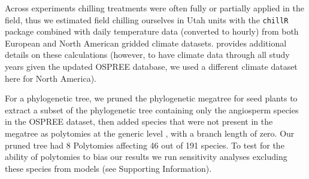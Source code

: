 \documentclass[11pt]{article}
\begin{document}
Across experiments chilling treatments were often fully or partially applied in the field, thus we estimated field chilling ourselves in Utah units with the \verb|chillR| package combined with daily temperature data (converted to hourly) from both European \citep[E-OBS, version 16, calculating the average of minimum and maximum daily temps,][]{cornes2018} and North American \citep[v3,][]{princetonclimate} gridded climate datasets. \citet{ettinger2020} provides additional details on these calculations (however, to have climate data through all study years given the updated OSPREE database, we used a different climate dataset here for North America).

For a phylogenetic tree, we pruned  the phylogenetic megatree for seed plants \citep{smith2018constructing} to extract a subset of the phylogenetic tree containing only the angiosperm species in the OSPREE dataset, then added species that were not present in the megatree as polytomies at the generic level \citep[using the function `congeneric.merge' in][]{pearse2015pez}, with a branch length of zero. Our pruned tree had 8 Polytomies affecting 46 out of 191 species. To test for the ability of polytomies to bias our results we run sensitivity analyses excluding these species from models (see Supporting Information). \\ 
\end{document}
